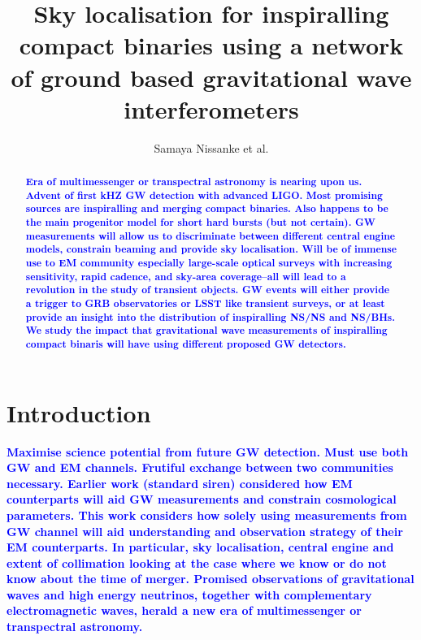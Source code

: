 \documentclass{emulateapj}
\newcommand{\samaya}[1]{\textcolor{blue}{\bf #1}}
\begin{document}
\title{ Sky localisation for inspiralling compact binaries using a
  network of ground based gravitational wave interferometers}

\author{Samaya Nissanke et al.}








\begin{abstract}
\samaya{Era of multimessenger or transpectral astronomy is nearing upon us. Advent of first kHZ GW detection with advanced LIGO. Most promising sources are inspiralling and merging compact binaries. Also happens to be the main progenitor model for short hard bursts (but not certain). GW measurements will allow us to discriminate between different central engine models, constrain beaming and provide sky localisation. Will be of immense use to EM community especially large-scale optical surveys with increasing sensitivity,
rapid cadence, and sky-area coverage--all will lead to a revolution in
the study of transient objects. GW events will either provide a
trigger to GRB observatories or LSST like transient surveys, or at
least provide an insight into the distribution of inspiralling NS/NS
and NS/BHs. We study the impact that gravitational wave measurements of
inspiralling compact binaris will have using different proposed GW detectors.}
\end{abstract}


\section{Introduction}

\samaya{Maximise science potential from future GW detection. Must use
  both GW and EM channels. Frutiful exchange between two communities
  necessary. Earlier work (standard siren) considered how EM
  counterparts will aid GW measurements and constrain cosmological
  parameters. This work considers how solely using measurements from
  GW channel will aid understanding and observation strategy of their
  EM counterparts. In particular, sky localisation, central engine and
  extent of collimation looking at the case where we know or do not
  know about the time of merger. Promised observations of gravitational waves and high energy
neutrinos, together with complementary electromagnetic waves, herald a new era of multimessenger or transpectral astronomy.}
\end{document}
